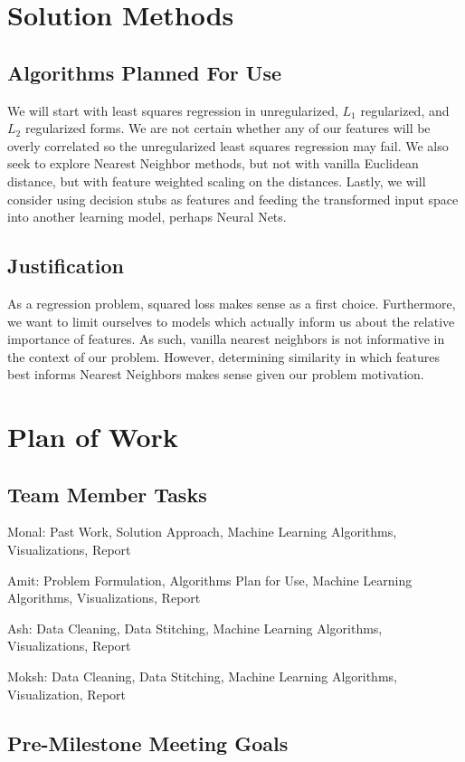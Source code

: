 \documentclass{article}
\begin{document}
\begin{multicols}{2}
\section{Solution Methods}
\subsection{Algorithms Planned For Use} We will start with least squares regression in unregularized, $L_1$ regularized, and $L_2$ regularized forms. We are not certain whether any of our features will be overly correlated so the unregularized least squares regression may fail. We also seek to explore Nearest Neighbor methods, but not with vanilla Euclidean distance, but with feature weighted scaling on the distances. Lastly, we will consider using decision stubs as features and feeding the transformed input space into another learning model, perhaps Neural Nets.
\subsection{Justification} As a regression problem, squared loss makes sense as a first choice. Furthermore, we want to limit ourselves to models which actually inform us about the relative importance of features. As such, vanilla nearest neighbors is not informative in the context of our problem. However, determining similarity in which features best informs Nearest Neighbors makes sense given our problem motivation.

\section{Plan of Work}
\subsection{Team Member Tasks} 

Monal: Past Work, Solution Approach, Machine Learning Algorithms, Visualizations, Report

Amit: Problem Formulation, Algorithms Plan for Use, Machine Learning Algorithms, Visualizations, Report

Ash: Data Cleaning, Data Stitching, Machine Learning Algorithms, Visualizations, Report

Moksh: Data Cleaning, Data Stitching, Machine Learning Algorithms, Visualization, Report

\subsection{Pre-Milestone Meeting Goals} 


\end{multicols}
\end{document}
